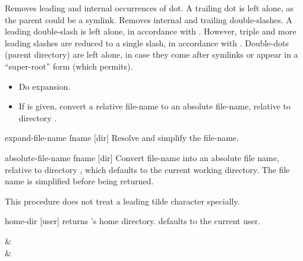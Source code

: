 \str
\begin{desc}
    Removes leading and internal occurrences of dot. 
    A trailing dot is left alone, as the parent could be a symlink.
    Removes internal and trailing double-slashes.
    A leading double-slash is left alone, in accordance with {\Posix}.
    However, triple and more leading slashes are reduced to a single slash,
    in accordance with {\Posix}.
    Double-dots (parent directory) are left alone, in case they come after
    symlinks or appear in a  ``super-root'' form
    (which {\Posix} permits).
\end{desc}

\str
\begin{desc}
    \begin{itemize}
    \item Do \ex{\~} expansion.
    \item If  is given,
      convert a relative file-name to an absolute file-name,
      relative to directory .
    \end{itemize}
\end{desc}

\begin{defundesc} {expand-file-name} {fname [dir]} \str
Resolve and simplify the file-name.
\end{defundesc}
    
\begin{defundesc} {absolute-file-name} {fname [dir]} \str
Convert file-name  into an absolute file name,
relative to directory , which defaults to the current
working directory. The file name is simplified before being
returned.

This procedure does not treat a leading tilde character specially.
\end{defundesc}

\begin{defundesc}  {home-dir} {[user]} \str
     returns 's home directory. 
         defaults to the current user.

    \begin{exampletable}
              &   \\
     & 
    \end{exampletable}
\end{defundesc}


